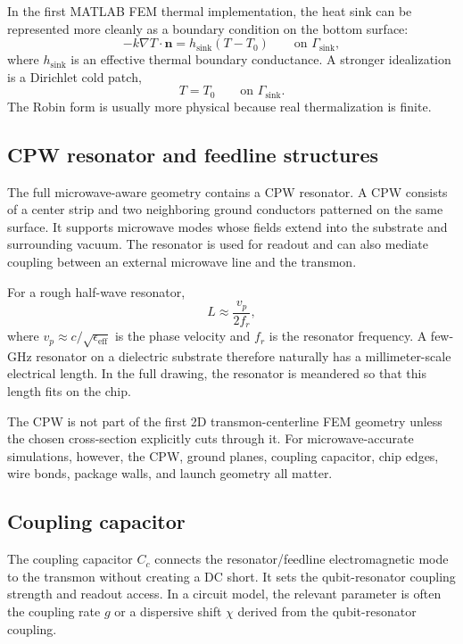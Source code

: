 \documentclass[11pt]{article}
\begin{document}
In the first MATLAB FEM thermal implementation, the heat sink can be represented more cleanly as a boundary condition on the bottom surface:
\begin{equation}
    -k\nabla T\cdot\mathbf{n} = h_{\mathrm{sink}}(T-T_0)
    \qquad \text{on } \Gamma_{\mathrm{sink}},
    \label{eq:robin_sink}
\end{equation}
where $h_{\mathrm{sink}}$ is an effective thermal boundary conductance. A stronger idealization is a Dirichlet cold patch,
\begin{equation}
    T=T_0 \qquad \text{on } \Gamma_{\mathrm{sink}}.
    \label{eq:dirichlet_sink}
\end{equation}
The Robin form is usually more physical because real thermalization is finite.

\subsection{CPW resonator and feedline structures}
The full microwave-aware geometry contains a CPW resonator. A CPW consists of a center strip and two neighboring ground conductors patterned on the same surface. It supports microwave modes whose fields extend into the substrate and surrounding vacuum. The resonator is used for readout and can also mediate coupling between an external microwave line and the transmon.

For a rough half-wave resonator,
\begin{equation}
    L \approx \frac{v_p}{2 f_r},
\end{equation}
where $v_p\approx c/\sqrt{\epsilon_{\mathrm{eff}}}$ is the phase velocity and $f_r$ is the resonator frequency. A few-GHz resonator on a dielectric substrate therefore naturally has a millimeter-scale electrical length. In the full drawing, the resonator is meandered so that this length fits on the chip.

The CPW is not part of the first 2D transmon-centerline FEM geometry unless the chosen cross-section explicitly cuts through it. For microwave-accurate simulations, however, the CPW, ground planes, coupling capacitor, chip edges, wire bonds, package walls, and launch geometry all matter.

\subsection{Coupling capacitor}
The coupling capacitor $C_c$ connects the resonator/feedline electromagnetic mode to the transmon without creating a DC short. It sets the qubit-resonator coupling strength and readout access. In a circuit model, the relevant parameter is often the coupling rate $g$ or a dispersive shift $\chi$ derived from the qubit-resonator coupling.
\end{document}
